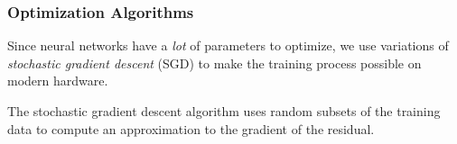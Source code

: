 \begin{frame}
    \frametitle{Optimization Algorithms}

    Since neural networks have a \textit{lot} of parameters to optimize, we use variations of \textit{stochastic gradient descent} (SGD) to make the training process possible on modern hardware.

    \bigskip
    \pause

    The stochastic gradient descent algorithm uses random subsets of the training data to compute an approximation to the gradient of the residual.

    \bigskip
    \pause

    

    
\end{frame}